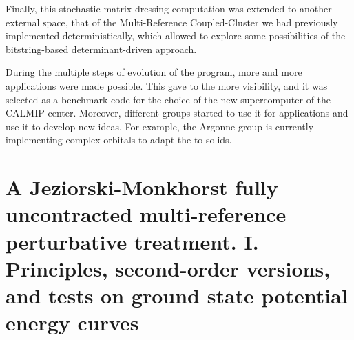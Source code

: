 \documentclass[12pt,a4paper]{report}
\begin{document}
Finally, this stochastic matrix dressing computation was extended to another external space, that of the Multi-Reference Coupled-Cluster we had previously implemented deterministically,\cite{Garniron_2017} which allowed to explore some possibilities of the bitstring-based determinant-driven approach.

During the multiple steps of evolution of the program, more and more applications were made possible.\cite{Loos_2018,Garniron_2018,Giner_2017,Garniron_2017,Garniron_2017b,Scemama_2018,1806.05115} This gave to the \QP more visibility, and it was selected as a benchmark code for the choice of the new supercomputer of the CALMIP center. Moreover, different groups started to use it for applications and use it to develop new ideas. For example, the Argonne group is currently implementing complex orbitals to 
adapt the \QP to solids.

\appendix

\chapter{A Jeziorski-Monkhorst fully uncontracted multi-reference perturbative treatment. I. Principles, second-order versions, and tests on ground state potential energy curves \cite{Giner_2017}}





%
\end{document}

